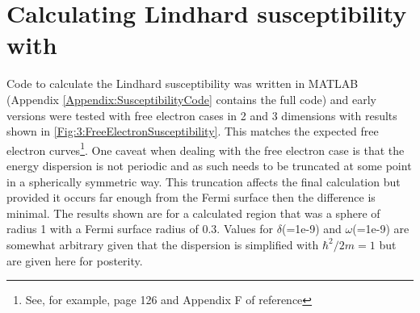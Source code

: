 \section{Calculating Lindhard susceptibility with }
    \label{Sec:2:Susceptibility}

Code to calculate the Lindhard susceptibility was written in MATLAB (Appendix \ref{Appendix:SusceptibilityCode} contains the full code) and early versions were tested with free electron cases in 2 and 3 dimensions with results shown in \fig\ref{Fig:3:FreeElectronSusceptibility}. This matches the expected free electron curves\footnote{See, for example, page 126 and Appendix F of reference\cite{Dressel2002}}. One caveat when dealing with the free electron case is that the energy dispersion is not periodic and as such needs to be truncated at some point in a spherically symmetric way. This truncation affects the final calculation but provided it occurs far enough from the Fermi surface then the difference is minimal. The results shown are for a calculated region that was a sphere of radius 1 with a Fermi surface radius of 0.3. Values for $\delta$(=1e-9) and $\omega$(=1e-9) are somewhat arbitrary given that the dispersion is simplified with $\hbar^2/2m = 1$ but are given here for posterity. 

